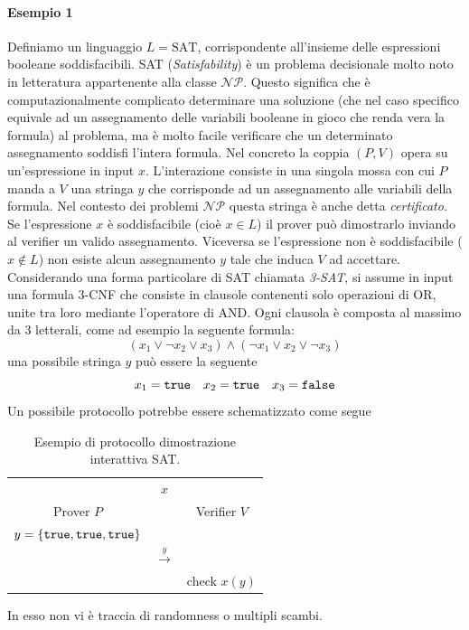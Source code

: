 \documentclass{article}
\theoremstyle{definition}
\begin{document}
\paragraph{Esempio 1}
Definiamo un linguaggio $L = \text{SAT}$, corrispondente all'insieme delle espressioni booleane soddisfacibili. SAT (\emph{Satisfability}) è un problema decisionale molto noto in letteratura appartenente alla classe \texttt{$\mathcal{NP}$}. Questo significa che è computazionalmente complicato determinare una soluzione (che nel caso specifico equivale ad un assegnamento delle variabili booleane in gioco che renda vera la formula) al problema, ma è molto facile verificare che un determinato assegnamento soddisfi l'intera formula.
Nel concreto la coppia $(P, V)$ opera su un'espressione in input $x$. L'interazione consiste in una singola mossa con cui $P$ manda a $V$ una stringa $y$ che corrisponde ad un assegnamento alle variabili della formula. Nel contesto dei problemi \texttt{$\mathcal{NP}$} questa stringa è anche detta \emph{certificato}.
Se l'espressione $x$ è soddisfacibile (cioè $x \in L$) il prover può dimostrarlo inviando al verifier un valido assegnamento. Viceversa se l'espressione non è soddisfacibile ($x \notin L$) non esiste alcun assegnamento $y$ tale che induca $V$ ad accettare.
Considerando una forma particolare di SAT chiamata \emph{3-SAT}, si assume in input una formula 3-CNF che consiste in clausole contenenti solo operazioni di OR, unite tra loro mediante l'operatore di AND. Ogni clausola è composta al massimo da 3 letterali, come ad esempio la seguente formula:
\begin{equation*}
(x_1 \lor \neg x_2 \lor x_3) \land (\neg x_1 \lor x_2 \lor \neg x_3)
\end{equation*}
una possibile stringa $y$ può essere la seguente 
\begin{equation*}
    x_1 = \text{\texttt{true}} \quad x_2 = \text{\texttt{true}} \quad x_3 = \text{\texttt{false}}
\end{equation*}
Un possibile protocollo potrebbe essere schematizzato come segue
\begin{table}[H]
\centering
\begin{tabular}{ccc}
                       & $x$               &              \\
Prover $P$             &                   & Verifier $V$ \\ \hline
$y = \left\{ \text{\texttt{true}}, \text{\texttt{true}}, \text{\texttt{true}} \right\}$ &                   &              \\
                       & $\overset{y} \longrightarrow$ &              \\
                       &                   & check $x(y)$
\end{tabular}
\caption{Esempio di protocollo dimostrazione interattiva SAT.}
\label{tab:protocolnp}
\end{table}
In esso non vi è traccia di randomness o multipli scambi.
\end{document}
